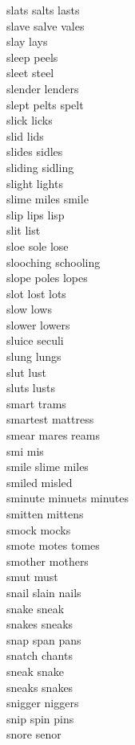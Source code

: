 slats salts lasts\\
slave salve vales\\
slay lays\\
sleep peels\\
sleet steel\\
slender lenders\\
slept pelts spelt\\
slick licks\\
slid lids\\
slides sidles\\
sliding sidling\\
slight lights\\
slime miles smile\\
slip lips lisp\\
slit list\\
sloe sole lose\\
slooching schooling\\
slope poles lopes\\
slot lost lots\\
slow lows\\
slower lowers\\
sluice seculi\\
slung lungs\\
slut lust\\
sluts lusts\\
smart trams\\
smartest mattress\\
smear mares reams\\
smi mis\\
smile slime miles\\
smiled misled\\
sminute minuets minutes\\
smitten mittens\\
smock mocks\\
smote motes tomes\\
smother mothers\\
smut must\\
snail slain nails\\
snake sneak\\
snakes sneaks\\
snap span pans\\
snatch chants\\
sneak snake\\
sneaks snakes\\
snigger niggers\\
snip spin pins\\
snore senor\\
